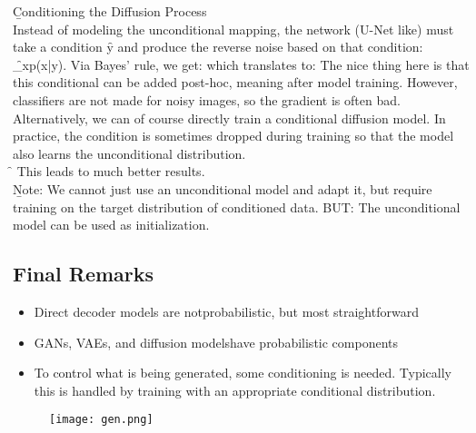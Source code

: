 \b{Conditioning the Diffusion Process\\[0.5em]}
Instead of modeling the unconditional mapping, the network (U-Net like) must take a condition \f{y} and produce the reverse noise based on that condition: \f{\nabla_x\log p(x|y)}. Via Bayes' rule, we get:
which translates to:
The nice thing here is that this conditional can be added post-hoc, meaning after model training. However, classifiers are not made for noisy images, so the gradient is often bad.\\
Alternatively, we can of course directly train a conditional diffusion model. In practice, the condition is sometimes dropped during training so that the model also learns the unconditional distribution.\\ \f{\to} This leads to much better results.\\

\b{Note:} We cannot just use an unconditional model and adapt it, but require training on the target distribution of conditioned data. BUT: The unconditional model can be used as initialization.

\newpage

\subsection{Final Remarks}
\begin{itemize}
    \item Direct decoder models are notprobabilistic, but most straightforward
    \item GANs, VAEs, and diffusion modelshave probabilistic components
    \item To control what is being generated, some conditioning is needed. Typically this is handled by training with an appropriate conditional distribution.
\end{itemize}
\vspace{2cm}
\begin{figure}[h!]
    \centering
    \texttt{[image: gen.png]}
\end{figure}







\newpage